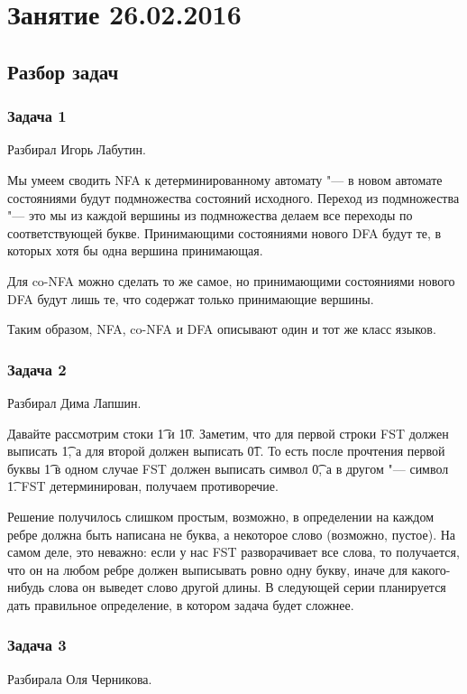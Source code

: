 \chapter{Занятие 26.02.2016}
\section{Разбор задач}

\subsection{Задача 1}
	Разбирал Игорь Лабутин.

	Мы умеем сводить NFA к детерминированному автомату "--- в новом
	автомате состояниями будут подмножества состояний исходного.
	Переход из подмножества "--- это мы из каждой вершины из подмножества
	делаем все переходы по соответствующей букве.
	Принимающими состояниями нового DFA будут те, в которых хотя бы одна вершина принимающая.

	Для co-NFA можно сделать то же самое, но принимающими состояниями нового DFA
	будут лишь те, что содержат только принимающие вершины.

	Таким образом, NFA, co-NFA и DFA описывают один и тот же класс языков.

\subsection{Задача 2}
	Разбирал Дима Лапшин.

	Давайте рассмотрим стоки \t{1} и \t{10}.
	Заметим, что для первой строки FST должен выписать \t{1},
	а для второй должен выписать \t{01}.
	То есть после прочтения первой буквы \t{1} в одном случае FST
	должен выписать символ \t{0}, а в другом "--- символ \t{1}.
	FST детерминирован, получаем противоречие.

	Решение получилось слишком простым, возможно, в определении на каждом
	ребре должна быть написана не буква, а некоторое слово (возможно, пустое).
	На самом деле, это неважно: если у нас FST разворачивает все слова,
	то получается, что он на любом ребре должен выписывать ровно одну букву,
	иначе для какого-нибудь слова он выведет слово другой длины.
	В следующей серии планируется дать правильное определение, в котором задача будет сложнее.

\subsection{Задача 3}
	Разбирала Оля Черникова.

